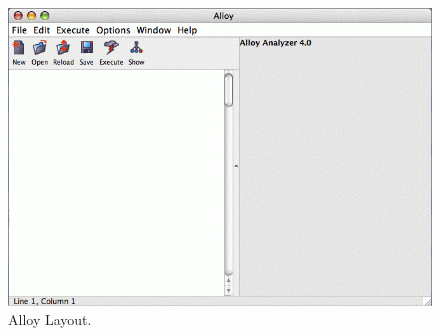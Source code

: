 \documentclass[a4paper,12pt]{extarticle}
\begin{document}
 \begin{figure}[h!]
\centering
 \includegraphics[width= 1\textwidth]{alloyblank.png}
\caption{Alloy Layout.}
 \end{figure}
\end{document}
